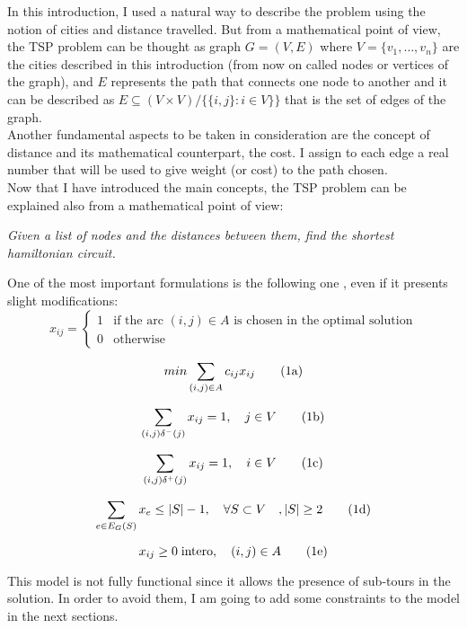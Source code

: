 In this introduction, I used a natural way to describe the problem using the notion of cities and distance travelled. But from a mathematical point of view, the TSP problem can be thought as graph $G=(V,E)$ where $V=\{v_1, \dots , v_n\}$ are the cities described in this introduction (from now on called nodes or vertices of the graph), and $E$ represents the path that connects one node to another and it can be described as $E \subseteq (V \times V) / \{\{i, j\}	:i \in V\}\}$ that is the set of edges of the graph.\\
Another fundamental aspects to be taken in consideration are the concept of distance and its mathematical counterpart, the cost. I assign to each edge a real number that will be used to give weight (or cost) to the path chosen.\\
Now that I have introduced the main concepts, the TSP problem can be explained also from a mathematical point of view:
\begin{displayquote}
	\textit{Given a list of nodes and the distances between them, find the shortest hamiltonian circuit.}
\end{displayquote}
One of the most important formulations is the following one \cite{ro1}, even if it presents slight modifications:
	\begin{equation}
	x_{ij}=
	\begin{cases}
	1 & \text{if the arc $(i, j) \in A$ is chosen in the optimal solution}\\
	0 & \text{otherwise}
	\end{cases}
	\end{equation}
	
	\begin{equation}
	\label{eqn:cost}
	min\sum_{(i,j)\in A}c_{ij}x_{ij}
	\stepcounter{equation}\tag{{\theequation}a}
	\end{equation}
	
	\begin{equation}
	\label{eqn:in}
	\sum_{(i,j)\delta^-(j)}x_{ij}=1, \quad j\in V
	\tag{{\theequation}b}
	\end{equation}
	
	\begin{equation}
	\label{eqn:out}
	\sum_{(i,j)\delta^+(j)}x_{ij}=1, \quad i\in V
	\tag{{\theequation}c}
	\end{equation}
	
	\begin{equation}
	\label{eqn:ragg}
	\sum_{e\in E_G(S)}x_{e}\le |S|-1, \quad \forall S \subset V\quad,|S|\ge 2
	\tag{{\theequation}d}
	\end{equation}
	
	\begin{equation}
	x_{ij}\ge 0 \; \text{intero} , \quad (i, j) \in A
	\tag{{\theequation}e}
	\end{equation}


This model is not fully functional since it allows the presence of sub-tours in the solution. In order to avoid them, I am going to add some constraints to the model in the next sections.